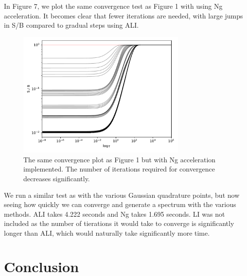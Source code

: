 \documentclass[12pt]{article}
\begin{document}
In Figure 7, we plot the same convergence test as Figure 1 with using Ng acceleration. It becomes clear that fewer iterations are needed, with large jumps in S/B compared to gradual steps using ALI.

\begin{figure}[ht]
 \centering
 \includegraphics[width=0.75\textwidth]{doc/figs/S_B_convergence.pdf}
 \caption{The same convergence plot as Figure 1 but with Ng acceleration implemented. The number of iterations required for convergence decreases significantly.}
\end{figure}

We run a similar test as with the various Gaussian quadrature points, but now seeing how quickly we can converge and generate a spectrum with the various methods. ALI takes 4.222 seconds and Ng takes 1.695 seconds. LI was not included as the number of tierations it would take to converge is significantly longer than ALI, which would naturally take significantly more time.  

\section{Conclusion}




\end{document}
